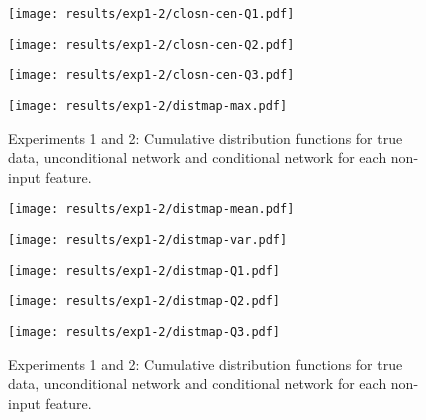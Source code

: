 \begin{figure}[ht]
	
	\begin{minipage}[b]{0.45\linewidth}
		\centering
		\texttt{[image: results/exp1-2/closn-cen-Q1.pdf]} 
		\label{fig:results-noninput-closn-cen-Q1}
	\end{minipage}
	\begin{minipage}[b]{0.45\linewidth}
		\centering
		\texttt{[image: results/exp1-2/closn-cen-Q2.pdf]} 
		\label{fig:results-noninput-closn-cen-Q2}
	\end{minipage} 
	
	
	\begin{minipage}[b]{0.45\linewidth}
		\centering
		\texttt{[image: results/exp1-2/closn-cen-Q3.pdf]} 
		\label{fig:results-noninput-closn-cen-Q3}
	\end{minipage}
	\begin{minipage}[b]{0.45\linewidth}
		\centering
		\texttt{[image: results/exp1-2/distmap-max.pdf]} 
		\label{fig:results-noninput-distmap-max}
	\end{minipage} 
	
	
	\caption[Graphical results for experiments 1 and 2]{Experiments 1 and 2: Cumulative distribution functions for true data, unconditional network and conditional network for each non-input feature.}
	
\end{figure}\begin{figure}[ht]
	\begin{minipage}[b]{0.45\linewidth}
		\centering
		\texttt{[image: results/exp1-2/distmap-mean.pdf]} 
		\label{fig:results-noninput-distmap-mean}
	\end{minipage}
	\begin{minipage}[b]{0.45\linewidth}
		\centering
		\texttt{[image: results/exp1-2/distmap-var.pdf]} 
		\label{fig:results-noninput-distmap-var}
	\end{minipage} 
	
	
	\begin{minipage}[b]{0.45\linewidth}
		\centering
		\texttt{[image: results/exp1-2/distmap-Q1.pdf]} 
		\label{fig:results-noninput-distmap-Q1}
	\end{minipage}
	\begin{minipage}[b]{0.45\linewidth}
		\centering
		\texttt{[image: results/exp1-2/distmap-Q2.pdf]} 
		\label{fig:results-noninput-distmap-Q2}
	\end{minipage} 
	
	
	\begin{minipage}[b]{0.45\linewidth}
		\centering
		\texttt{[image: results/exp1-2/distmap-Q3.pdf]} 
		\label{fig:results-noninput-distmap-Q3}
	\end{minipage}
	
	\caption[Graphical results for experiments 1 and 2]{Experiments 1 and 2: Cumulative distribution functions for true data, unconditional network and conditional network for each non-input feature.}
\end{figure}

